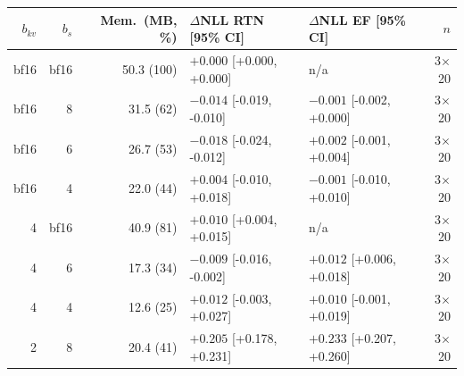\begin{tabular}{rrrllr}
\toprule
$b_{kv}$ & $b_s$ & Mem.\ (MB, \%) & $\Delta$NLL RTN [95\% CI] & $\Delta$NLL EF [95\% CI] & $n$ \\
\midrule
bf16 & bf16 & 50.3 (100) & $+0.000$ [+0.000, +0.000] & n/a & 3$\times$20 \\
bf16 & 8 & 31.5 (62) & $-0.014$ [-0.019, -0.010] & $-0.001$ [-0.002, +0.000] & 3$\times$20 \\
bf16 & 6 & 26.7 (53) & $-0.018$ [-0.024, -0.012] & $+0.002$ [-0.001, +0.004] & 3$\times$20 \\
bf16 & 4 & 22.0 (44) & $+0.004$ [-0.010, +0.018] & $-0.001$ [-0.010, +0.010] & 3$\times$20 \\
4 & bf16 & 40.9 (81) & $+0.010$ [+0.004, +0.015] & n/a & 3$\times$20 \\
4 & 6 & 17.3 (34) & $-0.009$ [-0.016, -0.002] & $+0.012$ [+0.006, +0.018] & 3$\times$20 \\
4 & 4 & 12.6 (25) & $+0.012$ [-0.003, +0.027] & $+0.010$ [-0.001, +0.019] & 3$\times$20 \\
2 & 8 & 20.4 (41) & $+0.205$ [+0.178, +0.231] & $+0.233$ [+0.207, +0.260] & 3$\times$20 \\
\bottomrule
\end{tabular}

